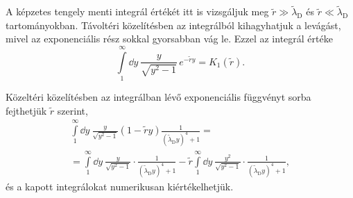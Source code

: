 \documentclass[a4paper,12pt,titlepage]{article}
\begin{document}
A képzetes tengely menti integrál értékét itt is vizsgáljuk meg $\tilde{r} \gg \tilde{\lambda}_\text{D}$ és $\tilde{r} \ll \tilde{\lambda}_\text{D}$ tartományokban.  Távoltéri közelítésben az integrálból kihagyhatjuk a levágást, mivel az exponenciális rész sokkal gyorsabban vág le. Ezzel az integrál értéke
\begin{equation} \label{g-sc-far-field}
	\int\limits_1^\infty \dd{y} ~ \frac{y}{\sqrt{y^2 - 1}} \, e^{-\tilde{r} y} = K_1(\tilde{r}).
\end{equation}

Közeltéri közelítésben az integrálban lévő exponenciális függvényt sorba fejthetjük $\tilde{r}$ szerint,
\begin{multline} \label{g-sc-near-field}
	\int\limits_1^\infty \dd{y} ~ \frac{y}{\sqrt{y^2 - 1}} \left( 1 - \tilde{r} y \right) \frac{1}{\left( \tilde{\lambda}_\text{D} y \right)^4 + 1} = \\
	= \int\limits_1^\infty \dd{y} ~ \frac{y}{\sqrt{y^2 - 1}} \cdot \frac{1}{\left( \tilde{\lambda}_\text{D} y \right)^4 + 1} - \tilde{r} \int\limits_1^\infty \dd{y} ~ \frac{y^2}{\sqrt{y^2 - 1}} \cdot \frac{1}{\left( \tilde{\lambda}_\text{D} y \right)^4 + 1},
\end{multline}
és a kapott integrálokat numerikusan kiértékelhetjük.
\end{document}
